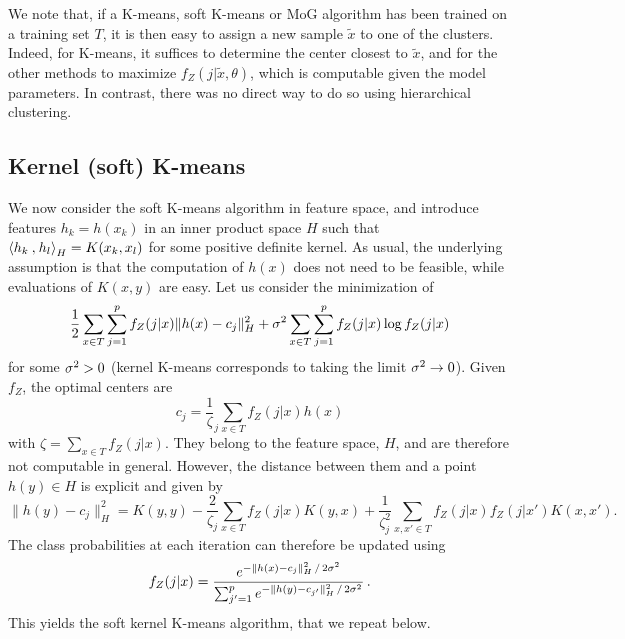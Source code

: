 \begin{remark}
\label{rem:assign.new}
We note that, if a K-means, soft K-means or MoG algorithm has been trained on a training set $T$, it is then easy to assign a new sample $\tilde x$ to one of the clusters. Indeed, for K-means, it suffices to determine the center closest to $\tilde x$, and for the other methods to maximize $f_Z(j|\tilde x, \theta)$, which is computable given the model parameters. In contrast, there was no direct way to do so using hierarchical clustering. 
\end{remark}

\subsection{Kernel (soft) K-means}

We now consider the soft K-means algorithm in feature space, and introduce
features $h_k = h(x_k)$ in an inner product space $H$ such that ${\langle {h_k}\mathbin{,} {h_l}\rangle}_H = K(x_k, x_l)$ for
some positive definite kernel. As usual, the underlying assumption is that the computation of $h(x)$ does not need to be feasible, while evaluations of $K(x,y)$ are easy. Let us consider the minimization of
$$
\frac12 \sum_{x\in T} \sum_{j=1}^p f_Z(j|x) \|h(x)- c_j\|_H^2 + \sigma^2 \sum_{x\in T}
\sum_{j=1}^p f_Z(j|x)\log f_Z(j|x)
$$
for some $\sigma^2>0$ (kernel K-means corresponds to taking the limit $\sigma^2\to 0$).
Given $f_Z$, the optimal centers are 
\[
c_j=\frac{1} \zeta_j \sum_{x\in T} f_Z(j|x) h(x)
\] 
with $\zeta = \sum_{x\in T} f_Z(j|x)$.
They belong to the feature space, $H$, and are therefore  not computable in general. However,
the distance between them and a point $h(y)\in H$ is explicit and
given by
\[
\|h(y) - c_j\|_H^2 =  K(y,y) - \frac{2}{\zeta_j}
\sum_{x\in T} f_Z(j|x) K(y,x) + \frac{1}{\zeta_j^2} \sum_{x,x'\in T}
f_Z(j|x)f_Z(j|x') K(x, x').
\]
 The class probabilities at each iteration can therefore be updated using
$$
f_Z(j|x) = \frac{e^{- \|h(x) - c_j\|_H^2\, / \, 2\sigma^2}}{\sum_{j'=1}^p e^{- \|h(y) - c_{j'}\|_H^2\, / \, 2\sigma^2}}\,.
$$
This yields the soft kernel K-means algorithm, that we repeat below.
